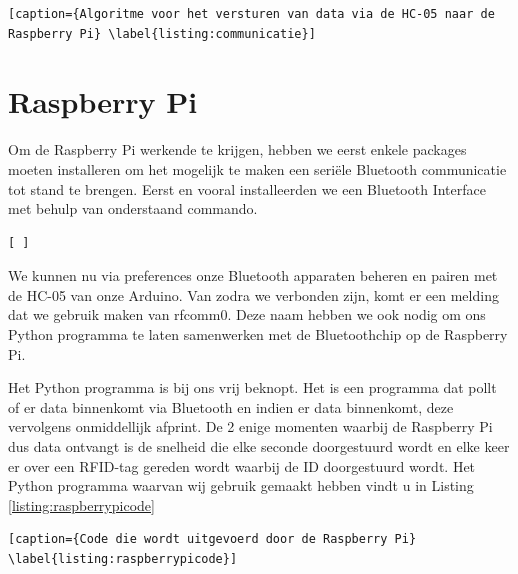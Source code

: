 
\begin{lstlisting}[caption={Algoritme voor het versturen van data via de HC-05 naar de Raspberry Pi} \label{listing:communicatie}]
\end{lstlisting}

\section{Raspberry Pi}


Om de Raspberry Pi werkende te krijgen, hebben we eerst enkele packages moeten installeren om het mogelijk te maken een seri\"ele Bluetooth communicatie tot stand te brengen. Eerst en vooral installeerden we een Bluetooth Interface met behulp van onderstaand commando.


\begin{lstlisting}[ ]
\end{lstlisting}

We kunnen nu via preferences onze Bluetooth apparaten beheren en pairen met de HC-05 van onze Arduino. Van zodra we verbonden zijn, komt er een melding dat we gebruik maken van rfcomm0. Deze naam hebben we ook nodig om ons Python programma te laten samenwerken met de Bluetoothchip op de Raspberry Pi. 

Het Python programma is bij ons vrij beknopt. Het is een programma dat pollt of er data binnenkomt via Bluetooth en indien er data binnenkomt, deze vervolgens onmiddellijk afprint. De 2 enige momenten waarbij de Raspberry Pi dus data ontvangt is de snelheid die elke seconde doorgestuurd wordt en elke keer er over een RFID-tag gereden wordt waarbij de ID doorgestuurd wordt. Het Python programma waarvan wij gebruik gemaakt hebben vindt u in Listing \ref{listing:raspberrypicode}



\begin{lstlisting}[caption={Code die wordt uitgevoerd door de Raspberry Pi} \label{listing:raspberrypicode}]
\end{lstlisting}



